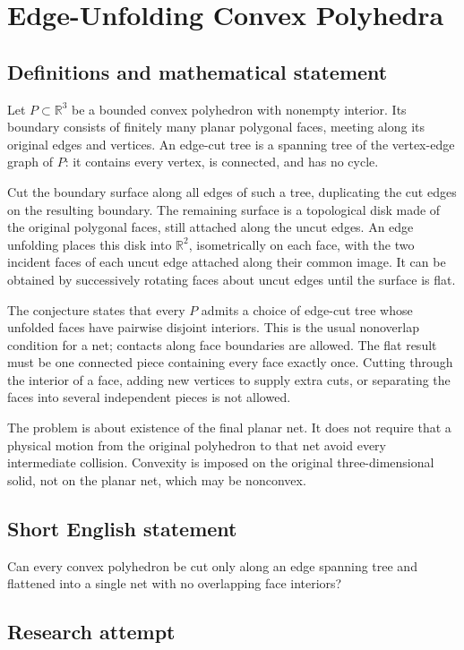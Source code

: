 \documentclass[11pt,a4paper]{article}
\begin{document}
\section*{Edge-Unfolding Convex Polyhedra}\label{statement}

\subsection{Definitions and mathematical statement}
Let $P\subset\mathbb R^3$ be a bounded convex polyhedron with nonempty
interior. Its boundary consists of finitely many planar polygonal faces,
meeting along its original edges and vertices. An edge-cut tree is a
spanning tree of the vertex-edge graph of $P$: it contains every vertex,
is connected, and has no cycle.

Cut the boundary surface along all edges of such a tree, duplicating the
cut edges on the resulting boundary. The remaining surface is a topological
disk made of the original polygonal faces, still attached along the uncut
edges. An edge unfolding places this disk into $\mathbb R^2$, isometrically
on each face, with the two incident faces of each uncut edge attached
along their common image. It can be obtained by successively rotating
faces about uncut edges until the surface is flat.

The conjecture states that every $P$ admits a choice of edge-cut tree
whose unfolded faces have pairwise disjoint interiors. This is the usual
nonoverlap condition for a net; contacts along face boundaries are allowed.
The flat result must be one connected piece containing every face exactly
once. Cutting through the interior of a face, adding new vertices to
supply extra cuts, or separating the faces into several independent pieces
is not allowed.

The problem is about existence of the final planar net. It does not
require that a physical motion from the original polyhedron to that net
avoid every intermediate collision. Convexity is imposed on the original
three-dimensional solid, not on the planar net, which may be nonconvex.
\subsection{Short English statement}
Can every convex polyhedron be cut only along an edge spanning tree and flattened into a single net with no overlapping face interiors?
\subsection{Research attempt}
\end{document}
